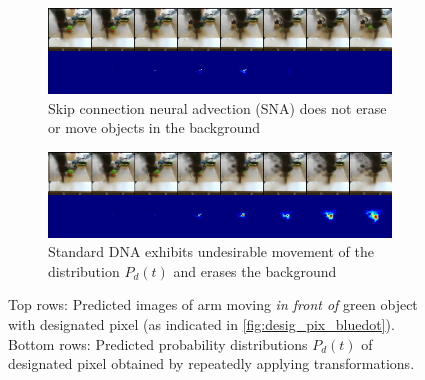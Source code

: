 \begin{figure}
    \centering
    \begin{subfigure}{0.9\columnwidth}
    \centering
        \includegraphics[width=1.\linewidth]{images_sna/occlusionaware/cdna_1ststep_bckgd_gen_pixb0_overtime.png}
        \caption{Skip connection neural advection (SNA) does not erase or move objects in the background}
        \label{fig:Ng1}
    \end{subfigure}
    \begin{subfigure}{0.9\columnwidth}
    \centering
        \includegraphics[width=1.0\linewidth]{images_sna/occlusionaware/orig_dna_gen_pixb0_overtime.png}
        \caption{Standard DNA \cite{foresight} exhibits undesirable movement of the distribution $P_{d}(t)$ and erases the background}
        \label{fig:pix_reappear}
    \end{subfigure}
    \caption{
    Top rows: Predicted images of arm moving \textit{in front of} green object with designated pixel (as indicated in \autoref{fig:desig_pix_bluedot}). 
    Bottom rows: Predicted probability distributions $P_{d}(t)$ of designated pixel obtained by repeatedly applying transformations.}
    \label{fig:pix_reappear}
\end{figure}
